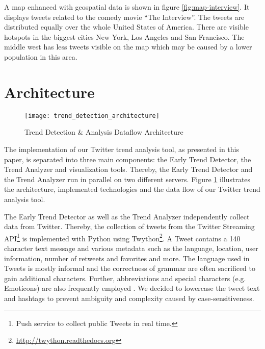 A map enhanced with geospatial data is shown in figure \ref{fig:map-interview}. It displays tweets related to the comedy movie \enquote{The Interview}. The tweets are distributed equally over the whole United States of America. There are visible hotspots in the biggest cities New York, Los Angeles and San Francisco. The middle west has less tweets visible on the map which may be caused by a lower population in this area.

\section{Architecture}
\label{sec:architecture}

\begin{figure}[H]
  \centering
        \texttt{[image: trend\_detection\_architecture]}
  \caption[Trend Detection \& Analysis Dataflow Architecture]{Trend Detection \& Analysis Dataflow Architecture}
  \label{fig:twitter-trend-analysis-architecture}
\end{figure}


The implementation of our Twitter trend analysis tool, as presented in this paper, is separated into three main components: the Early Trend Detector, the Trend Analyzer and visualization tools. Thereby, the Early Trend Detector and the Trend Analyzer run in parallel on two different servers. Figure \ref{fig:twitter-trend-analysis-architecture} illustrates the architecture, implemented technologies and the data flow of our Twitter trend analysis tool.

The Early Trend Detector as well as the Trend Analyzer independently collect data from Twitter. Thereby, the collection of tweets from the Twitter Streaming API\footnote{Push service to collect public Tweets in real time.} is implemented with Python using Twython\footnote{\url{http://twython.readthedocs.org} \accessednote}. A Tweet contains a 140 character text message and various metadata such as the language, location, user information, number of retweets and favorites and more. The language used in Tweets is mostly informal and the correctness of grammar are often sacrificed to gain additional characters. Further, abbreviations and special characters (e.g. Emoticons) are also frequently employed \cite[67]{TwitterDataAnalytics2013}. We decided to lowercase the tweet text and hashtags to prevent ambiguity and complexity caused by case-sensitiveness. 

